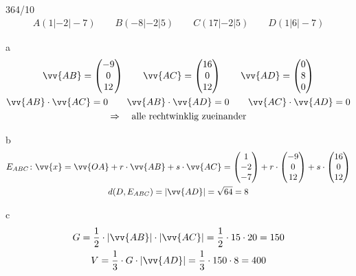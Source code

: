 \begin{exercise}{364/10}
  \begin{gather*}
    A(1|-2|-7) \qquad B(-8|-2|5) \qquad C(17|-2|5) \qquad D(1|6|-7)
  \end{gather*}
  \item [a]
  \begin{gather*}
    \vv{AB} = \begin{pmatrix}-9 \\ 0 \\ 12\end{pmatrix} \qquad \vv{AC} = \begin{pmatrix}16 \\ 0 \\ 12\end{pmatrix} \qquad \vv{AD} = \begin{pmatrix}0 \\ 8 \\ 0\end{pmatrix} \\
    \vv{AB} \cdot \vv{AC} = 0 \qquad \vv{AB} \cdot \vv{AD} = 0 \qquad \vv{AC} \cdot \vv{AD} = 0 \\
    \Rightarrow\quad \text{alle rechtwinklig zueinander}
  \end{gather*}
  \item [b]
  \begin{gather*}
    E_{ABC} \colon \vv{x} = \vv{OA} + r \cdot \vv{AB} + s \cdot \vv{AC} = \begin{pmatrix}1 \\ -2 \\ -7\end{pmatrix} + r \cdot \begin{pmatrix}-9 \\ 0 \\ 12\end{pmatrix} + s \cdot \begin{pmatrix}16 \\ 0 \\ 12\end{pmatrix} \\
    d(D, E_{ABC}) = |\vv{AD}| = \sqrt{64} = 8
  \end{gather*}
  \item [c]
  \begin{gather*}
    G = \frac{1}{2} \cdot |\vv{AB}| \cdot |\vv{AC}| = \frac{1}{2} \cdot 15 \cdot 20 = 150 \\
    V = \frac{1}{3} \cdot G \cdot |\vv{AD}| = \frac{1}{3} \cdot 150 \cdot 8 = 400
  \end{gather*}

\end{exercise}
